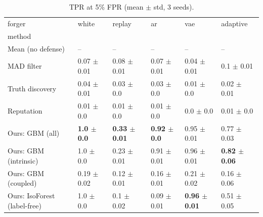 \begin{table}
\caption{TPR at 5\% FPR (mean $\pm$ std, 3 seeds).}
\label{tab:tpr}
\begin{tabular}{llllll}
\toprule
forger & white & replay & ar & vae & adaptive \\
method &  &  &  &  &  \\
\midrule
Mean (no defense) & -- & -- & -- & -- & -- \\
MAD filter & 0.07 $\pm$ 0.01 & 0.08 $\pm$ 0.01 & 0.07 $\pm$ 0.01 & 0.04 $\pm$ 0.01 & 0.1 $\pm$ 0.01 \\
Truth discovery & 0.04 $\pm$ 0.01 & 0.03 $\pm$ 0.0 & 0.03 $\pm$ 0.0 & 0.01 $\pm$ 0.0 & 0.02 $\pm$ 0.01 \\
Reputation & 0.01 $\pm$ 0.0 & 0.01 $\pm$ 0.0 & 0.01 $\pm$ 0.0 & 0.0 $\pm$ 0.0 & 0.01 $\pm$ 0.0 \\
Ours: GBM (all) & \textbf{1.0 $\pm$ 0.0} & \textbf{0.33 $\pm$ 0.01} & \textbf{0.92 $\pm$ 0.0} & 0.95 $\pm$ 0.01 & 0.77 $\pm$ 0.03 \\
Ours: GBM (intrinsic) & 1.0 $\pm$ 0.0 & 0.23 $\pm$ 0.01 & 0.91 $\pm$ 0.01 & 0.96 $\pm$ 0.01 & \textbf{0.82 $\pm$ 0.06} \\
Ours: GBM (coupled) & 0.19 $\pm$ 0.02 & 0.12 $\pm$ 0.01 & 0.16 $\pm$ 0.01 & 0.21 $\pm$ 0.02 & 0.16 $\pm$ 0.06 \\
Ours: IsoForest (label-free) & 1.0 $\pm$ 0.0 & 0.1 $\pm$ 0.02 & 0.09 $\pm$ 0.01 & \textbf{0.96 $\pm$ 0.01} & 0.51 $\pm$ 0.05 \\
\bottomrule
\end{tabular}
\end{table}

